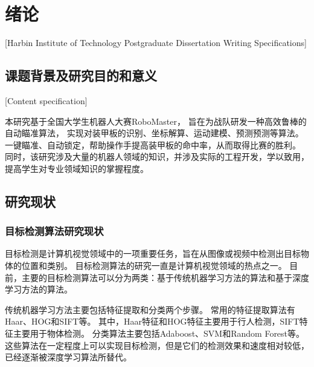 
\chapter[绪论]{绪论}[Harbin Institute of Technology Postgraduate Dissertation Writing Specifications]

\section{课题背景及研究目的和意义}[Content specification]

本研究基于全国大学生机器人大赛RoboMaster，
旨在为战队研发一种高效鲁棒的自动瞄准算法，
实现对装甲板的识别、坐标解算、运动建模、预测预测等算法。
一键瞄准、自动锁定，帮助操作手提高装甲板的命中率，从而取得比赛的胜利。
同时，该研究涉及大量的机器人领域的知识，并涉及实际的工程开发，学以致用，提高学生对专业领域知识的掌握程度。

\section{研究现状}

\subsection{目标检测算法研究现状}
目标检测是计算机视觉领域中的一项重要任务，旨在从图像或视频中检测出目标物体的位置和类别。
目标检测算法的研究一直是计算机视觉领域的热点之一。
目前，主要的目标检测算法可以分为两类：基于传统机器学习方法的算法和基于深度学习方法的算法。\par


传统机器学习方法主要包括特征提取和分类两个步骤。
常用的特征提取算法有Haar、HOG和SIFT等。
其中，Haar特征和HOG特征主要用于行人检测，SIFT特征主要用于物体检测。
分类算法主要包括Adaboost、SVM和Random Forest等。
这些算法在一定程度上可以实现目标检测，但是它们的检测效果和速度相对较低，已经逐渐被深度学习算法所替代。

\par

